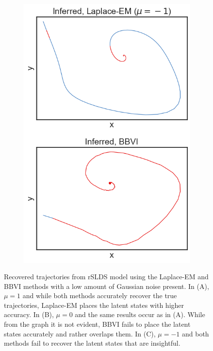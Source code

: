 \begin{figure}
\begin{subfigure}[b]{0.33\linewidth}
        \includegraphics[width=\linewidth]{./Figures/vdp-good-mu-1.png}
        \caption{}
        \label{goodvdp:c}
        \vspace{4ex}
    \end{subfigure}
    \caption{Recovered trajectories from rSLDS model using the Laplace-EM and BBVI methods with a low amount of Gaussian noise present. In (A), $\mu = 1$ and while both methods accurately recover the true trajectories, Laplace-EM places the latent states with higher accuracy. In (B), $\mu = 0$ and the same results occur as in (A). While from the graph it is not evident, BBVI fails to place the latent states accurately and rather overlaps them. In (C), $\mu = -1$ and both methods fail to recover the latent states that are insightful.}
    \label{goodvdp}
\end{figure}

